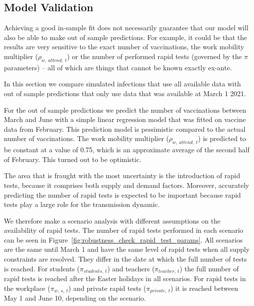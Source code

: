\subsection{Model Validation}
\label{subsec:model_validation}

Achieving a good in-sample fit does not necessarily guarantee that our model will also be
able to make out of sample predictions. For example, it could be that the results are
very sensitive to the exact number of vaccinations, the work mobility multiplier
($\rho_{w,\:attend,\:t}$) or the number of performed rapid tests (governed by the $\pi$
parameters) -- all of which are things that cannot be known exactly ex-ante.

In this section we compare simulated infections that use all available data with
out of sample predictions that only use data that was available at March 1 2021.

For the out of sample predictions we predict the number of vaccinations between March and
June with a simple linear regression model that was fitted on vaccine data from February.
This prediction model is pessimistic compared to the actual number of vaccinations. The
work mobility multiplier ($\rho_{w,\:attend,\:t}$) is predicted to be constant at a value
of 0.75, which is an approximate average of the second half of February. This turned out
to be optimistic.

The area that is fraught with the most uncertainty is the introduction of rapid tests,
because it comprises both supply and demand factors. Moreover, accurately predicting the
number of rapid tests is expected to be important because rapid tests play a large role
for the transmission dynamic.

We therefore make a scenario analysis with different assumptions on the availability of
rapid tests. The number of rapid tests performed in each scenario can be seen in
Figure~\ref{fig:robustness_check_rapid_test_params}. All scenarios are the same until
March 1 and have the same level of rapid tests when all supply constraints are resolved.
They differ in the date at which the full number of tests is reached. For students
($\pi_{students,\:t}$) and teachers ($\pi_{teacher,\:t}$) the full number of rapid tests
is reached after the Easter holidays in all scenarios. For rapid tests in the workplace
($\pi_{w,\:s,\:t}$) and private rapid tests ($\pi_{private,\:t}$) it is reached between
May 1 and June 10, depending on the scenario.


